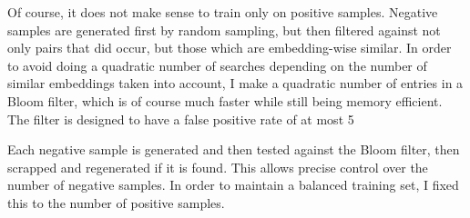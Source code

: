 Of course, it does not make sense to train only on positive samples. Negative samples are generated first by random sampling, but then filtered against not only pairs that did occur, but those which are embedding-wise similar. In order to avoid doing a quadratic number of searches depending on the number of similar embeddings taken into account, I make a quadratic number of entries in a Bloom filter, which is of course much faster while still being memory efficient. The filter is designed to have a false positive rate of at most 5%

Each negative sample is generated and then tested against the Bloom filter, then scrapped and regenerated if it is found. This allows precise control over the number of negative samples. In order to maintain a balanced training set, I fixed this to the number of positive samples.


